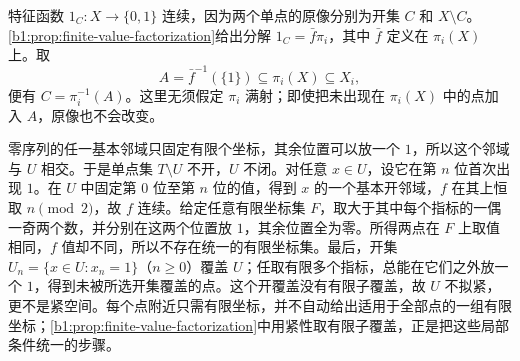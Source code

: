 \begin{solution}
	特征函数 \(1_C:X\rightarrow\{0,1\}\) 连续，因为两个单点的原像分别为开集 \(C\) 和 \(X\setminus C\)。\cref{b1:prop:finite-value-factorization}给出分解 \(1_C=\bar f\pi_i\)，其中 \(\bar f\) 定义在 \(\pi_i(X)\) 上。取
	\[
		A=\bar f^{-1}(\{1\})\subseteq\pi_i(X)\subseteq X_i,
	\]
	便有 \(C=\pi_i^{-1}(A)\)。这里无须假定 \(\pi_i\) 满射；即使把未出现在 \(\pi_i(X)\) 中的点加入 \(A\)，原像也不会改变。

	零序列的任一基本邻域只固定有限个坐标，其余位置可以放一个 \(1\)，所以这个邻域与 \(U\) 相交。于是单点集 \(T\setminus U\) 不开，\(U\) 不闭。对任意 \(x\in U\)，设它在第 \(n\) 位首次出现 \(1\)。在 \(U\) 中固定第 \(0\) 位至第 \(n\) 位的值，得到 \(x\) 的一个基本开邻域，\(f\) 在其上恒取 \(n\pmod 2\)，故 \(f\) 连续。给定任意有限坐标集 \(F\)，取大于其中每个指标的一偶一奇两个数，并分别在这两个位置放 \(1\)，其余位置全为零。所得两点在 \(F\) 上取值相同，\(f\) 值却不同，所以不存在统一的有限坐标集。最后，开集 \(U_n=\{x\in U:x_n=1\}\)（\(n\geq0\)）覆盖 \(U\)；任取有限多个指标，总能在它们之外放一个 \(1\)，得到未被所选开集覆盖的点。这个开覆盖没有有限子覆盖，故 \(U\) 不拟紧，更不是紧空间。每个点附近只需有限坐标，并不自动给出适用于全部点的一组有限坐标；\cref{b1:prop:finite-value-factorization}中用紧性取有限子覆盖，正是把这些局部条件统一的步骤。
\end{solution}
